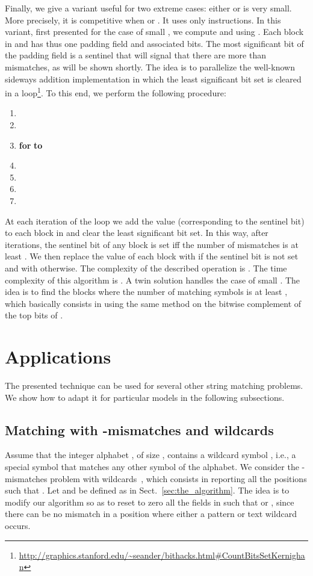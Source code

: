 \documentclass{llncs}
\begin{document}
Finally, we give a variant useful for two extreme cases:
either  or  is very small.
More precisely, it is competitive when  or .
It uses only  instructions.
In this variant, first presented for the case of small , we compute  and  using .
Each block in  and  has
thus one padding field and  associated bits. The most significant bit
of the padding field is a sentinel that will signal that there
are more than  mismatches, as
will be shown shortly.
The idea is to parallelize the well-known
sideways addition implementation in which the least significant bit
set is cleared in a
loop\footnote{\url{http://graphics.stanford.edu/~seander/bithacks.html#CountBitsSetKernighan}}.
To this end, we perform the following procedure:
\begin{enumerate}
\item 
\item 
\item \textbf{for}  \textbf{to} 
\item \qquad 
\item \qquad 
\item 
\item 
\end{enumerate}
At each iteration of the loop we add the value 
(corresponding to the sentinel bit) to each block in  and clear
the least significant bit set. In this way, after  iterations,
the sentinel bit of any block is set iff the number of mismatches
is at least . We then replace the value of each block with 
if the sentinel bit is not set and with  otherwise.
The complexity of the described operation is . The time complexity
of this algorithm is .
A twin solution handles the case of small . The idea is to
find the blocks where the number of matching symbols is at least ,
which basically consists in using the same method on the bitwise complement of the top bits of
.

\section{Applications}


\noindent
The presented technique can be used for several other string matching problems.
We show how to adapt it for particular models in the following subsections.

\subsection{Matching with -mismatches and wildcards}
Assume that the integer alphabet , of size , contains a
wildcard symbol  , i.e., a special symbol that matches any other
symbol of the alphabet. We consider the -mismatches problem with
wildcards~\cite{DBLP:conf/soda/CliffordEPR09}, which consists in reporting all the positions  such that
.
Let  and  be defined as in Sect.~\ref{sec:the_algorithm}.
The idea is to modify our algorithm so as to reset to zero all the
fields  in  such that  or
, since there can be no mismatch in a position where
either a pattern or text wildcard occurs.
\end{document}
